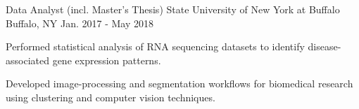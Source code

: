 \begin{cventries}
  \cventry
    {Data Analyst (incl. Master's Thesis)} %
    {State University of New York at Buffalo} %
    {Buffalo, NY} %
    {Jan. 2017 - May 2018} %
    {
      \begin{cvitems} %
        \item {Performed statistical analysis of RNA sequencing datasets to identify disease-associated gene expression patterns.}
        \item {Developed image-processing and segmentation workflows for biomedical research using clustering and computer vision techniques.}
      \end{cvitems}
    }
\end{cventries}